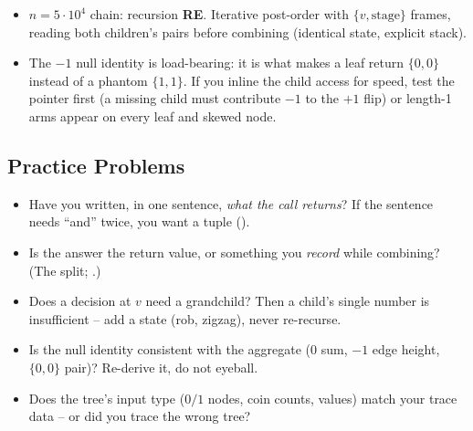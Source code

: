 \begin{hardeningbox}
\begin{itemize}[nosep, leftmargin=1.4em]
  \item $n=5\cdot10^{4}$ chain: recursion \textbf{RE}. Iterative post-order with
        $\{v,\text{stage}\}$ frames, reading both children's pairs before
        combining (identical state, explicit stack).
  \item The $-1$ null identity is load-bearing: it is what makes a leaf return
        $\{0,0\}$ instead of a phantom $\{1,1\}$. If you inline the child access
        for speed, test the pointer first (a missing child must contribute $-1$
        to the $+1$ flip) or length-1 arms appear on every leaf and skewed node.
\end{itemize}
\end{hardeningbox}

\subsection{Practice Problems}

\begin{stuckbox}
\begin{itemize}[nosep, leftmargin=1.4em]
  \item Have you written, in one sentence, \emph{what the call returns}? If the
        sentence needs ``and'' twice, you want a tuple ().
  \item Is the answer the return value, or something you \emph{record} while
        combining? (The  split; .)
  \item Does a decision at $v$ need a grandchild? Then a child's single number is
        insufficient -- add a state (rob, zigzag), never re-recurse.
  \item Is the null identity consistent with the aggregate ($0$ sum, $-1$ edge
        height, $\{0,0\}$ pair)? Re-derive it, do not eyeball.
  \item Does the tree's input type ($0/1$ nodes, coin counts, values) match your
        trace data -- or did you trace the wrong tree?
\end{itemize}
\end{stuckbox}

